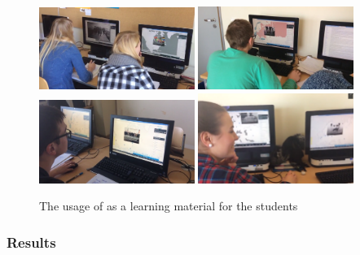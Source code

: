 \begin{figure}[tb]
  \begin{center}
    \includegraphics[width=0.45\textwidth]{graphics/students-1.png}
    \includegraphics[width=0.45\textwidth]{graphics/students-2.png}
    \includegraphics[width=0.45\textwidth]{graphics/students-3.png}
    \includegraphics[width=0.45\textwidth]{graphics/students-4.png}
  \end{center}
  \caption{The usage of \HG as a learning material for the students}
  \label{fig:students}
\end{figure}


\subsubsection{Results} %
\label{ssub:results-2}

